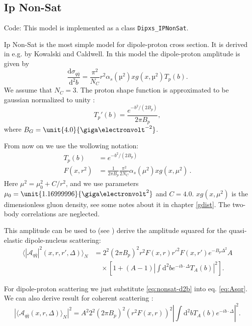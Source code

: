\documentclass[a4paper,12pt]{article}
\newcommand{\code}[1]{\texttt{#1}}
\newcommand{\der}{\mathrm{d}}
\newcommand{\A}{\mathcal{A}}
\begin{document}
\subsection{Ip Non-Sat}
Code: This model is implemented as a class \code{Dipxs\_IPNonSat}.

Ip Non-Sat is the most simple model for dipole-proton cross section. It is derived in e.g. \cite{Caldwell:2009ke} by Kowalski and Caldwell. In this model the dipole-proton amplitude is given by
\begin{equation}
	\label{eq:nonsat-d2b}
	\frac{\der \sigma_{q\bar q}}{\der^2 b} = \frac{\pi^2}{N_C}r^2 \alpha_s(µ^2)xg(x,µ^2) T_p(b). 
\end{equation}
We assume that $N_C=3$. The proton shape function is approximated to be gaussian normalized to unity \cite{Caldwell:2009ke}:
\begin{equation}
	T_p'(b) = \frac{e^{-b^2/(2B_p)}}{2\pi B_p},
\end{equation}
where $B_G=\unit{4.0}{\giga\electronvolt^{-2}}$.

From now on we use the wollowing notation:
\begin{align}
	T_p(b) &= e^{-b^2/(2B_p)} \\
	F(x,r^2) &= \frac{1}{2\pi B_p} \frac{\pi^2}{2 N_C} \alpha_s\left(\mu^2 \right) xg\left(x, \mu^2\right) \, .
\end{align}
Here $\mu^2 = \mu_0^2 + C/r^2$, and we use parameters $\mu_0 = \unit{1.16999996}{\giga\electronvolt^2}$ and $C=4.0$. $xg(x,\mu^2)$ is the dimensionless gluon density, see some notes about it in chapter \ref{gdist}. The two-body correlations are neglected.

This amplitude can be used to (see \cite{Caldwell:2009ke}) derive the amplitude squared for the quasi-elastic dipole-nucleus scattering:
\begin{equation}
\begin{split}
	\langle|\A_{q\bar q}|^2(x,r,r',\Delta)\rangle_N &= 2^2(2\pi B_p)^2 r^2F(x,r)r'^2F(x,r') e^{-B_p \Delta^2} A  \\
	& \quad \times \left[ 1 + (A-1) \left| \int \der^2 b e^{-ib \cdot \Delta} T_A(b)\right|^2 \right] . 
\end{split}
\end{equation}

For dipole-proton scattering we just substitute \eqref{eq:nonsat-d2b} into eq. \eqref{eq:Asqr}. We can also derive result for coherent scattering \cite{Caldwell:2009ke}:
\begin{equation}
	|\langle \A_{q\bar q}(x,r,\Delta)\rangle_N|^2 = A^2 2^2 (2\pi B_p)^2 (r^2F(x,r))^2 \left| \int \der^2 b T_A(b) e^{-ib \cdot \Delta} \right|^2 .
\end{equation}
\end{document}
